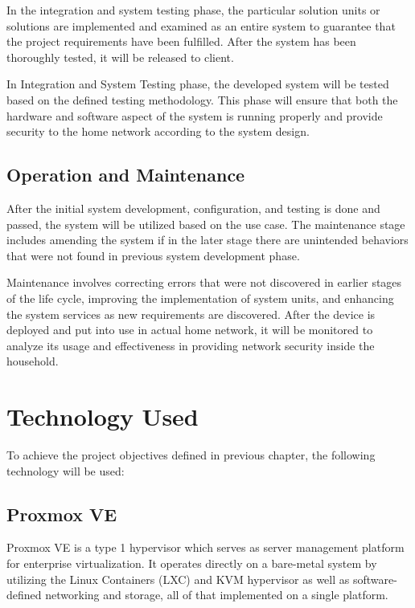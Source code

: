 \documentclass[../index.tex]{subfiles}
\begin{document}
In the integration and system testing phase, the particular solution units or
solutions are implemented and examined as an entire system to guarantee that the
project requirements have been fulfilled. After the system has been thoroughly tested,
it will be released to client.

In Integration and System Testing phase, the developed system will be tested
based on the defined testing methodology. This phase will ensure that both the
hardware and software aspect of the system is running properly and provide security
to the home network according to the system design.


\subsection{Operation and Maintenance}

After the initial system development, configuration, and testing is done and passed, the system will
be utilized based on the use case. The maintenance stage includes amending the system if in the
later stage there are unintended behaviors that were not found in previous system development phase.

Maintenance involves correcting errors that were not discovered in earlier
stages of the life cycle, improving the implementation of system units, and enhancing
the system services as new requirements are discovered.
After the device is deployed and put into use in actual home network, it will be
monitored to analyze its usage and effectiveness in providing network security inside
the household.

\section{Technology Used}

To achieve the project objectives defined in previous chapter, the following
technology will be used:

\subsection{Proxmox VE}

Proxmox VE is a type 1 hypervisor which serves as server management
platform for enterprise virtualization. It operates directly on a bare-metal system by
utilizing the Linux Containers (LXC) and KVM hypervisor as well as software-defined
networking and storage, all of that implemented on a single platform.
\end{document}
